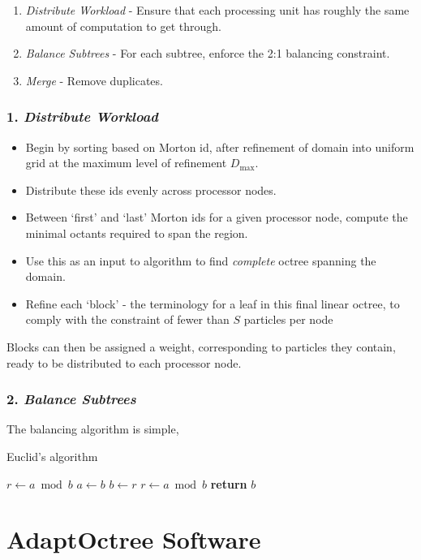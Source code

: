 \documentclass[12pt, a4, twoside]{article}
\begin{document}
\begin{enumerate}
    \item \textit{Distribute Workload} - Ensure that each processing unit has roughly the same amount of computation to get through.
    \item \textit{Balance Subtrees} - For each subtree, enforce the 2:1 balancing constraint.
    \item \textit{Merge} - Remove duplicates.
\end{enumerate}

\subsubsection*{1. \textit{Distribute Workload}}

\begin{itemize}
    \item Begin by sorting based on Morton id, after refinement of domain into uniform grid at the maximum level of refinement $D_{\max}$.
    \item Distribute these ids evenly across processor nodes.
    \item Between `first' and `last' Morton ids for a given processor node, compute the minimal octants required to span the region.
    \item Use this as an input to algorithm to find \textit{complete} octree spanning the domain.
    \item Refine each `block' - the terminology for a leaf in this final linear octree, to comply with the constraint of fewer than $S$ particles per node
\end{itemize}

Blocks can then be assigned a weight, corresponding to particles they contain, ready to be distributed to each processor node.

\subsubsection*{2. \textit{Balance Subtrees}}

The balancing algorithm is simple,


\begin{algorithm}
    \caption{Euclid’s algorithm}\label{euclid}
    \begin{algorithmic}[1]
    \State $r\gets a\bmod b$
    \State $a\gets b$
    \State $b\gets r$
    \State $r\gets a\bmod b$
    \EndWhile\label{euclidendwhile}
    \State \textbf{return} $b$
    \EndFunction
    \end{algorithmic}
 \end{algorithm}

\section*{AdaptOctree Software}


\printbibliography
\end{document}
